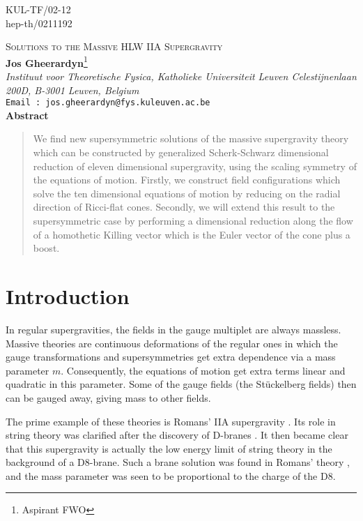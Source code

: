 \documentclass[a4paper,12pt]{article}
\begin{document}
\setcounter{page}{0}
\thispagestyle{empty}
\begin{flushright}
KUL-TF/02-12\\
hep-th/0211192\\[4cm]
\end{flushright}
\begin{center}
{\Large \textsc{Solutions to the Massive HLW IIA Supergravity}}\\[2cm]
{\bf Jos Gheerardyn}\footnote{Aspirant FWO}\\
\vspace{1cm}
\textit{Instituut voor Theoretische Fysica, Katholieke Universiteit Leuven \break
Celestijnenlaan 200D, B-3001 Leuven, Belgium}\\[.5cm]
\texttt{Email : jos.gheerardyn@fys.kuleuven.ac.be}\\[4cm]
{\bf Abstract}\\[.5cm]
\begin{quote}
{\small We find new supersymmetric solutions of the massive supergravity theory which can be constructed by generalized
Scherk-Schwarz dimensional reduction of eleven dimensional supergravity, using the scaling symmetry of the
equations of motion. Firstly, we construct field configurations which solve the ten dimensional equations of motion by reducing on the radial direction of Ricci-flat cones. Secondly, we will extend this result to the supersymmetric case by performing a dimensional reduction along the flow of a homothetic Killing vector which is the Euler vector of the cone plus a boost.}
\end{quote}
\end{center}
\newpage
\section{Introduction}
In regular supergravities, the fields in the gauge multiplet are always massless. Massive theories are continuous deformations of the regular ones in which the gauge transformations and supersymmetries get extra dependence via a mass parameter $m$. Consequently, the equations of motion get extra terms linear and quadratic in this parameter. Some of the gauge fields (the St\"uckelberg fields) then can be gauged away, giving mass to other fields.

The prime example of these theories is Romans' IIA supergravity \cite{Romans:1986tz}. Its role in string theory was clarified after the discovery of D-branes \cite{Polchinski:1995mt}. It then became clear that this supergravity is actually the low energy limit of string theory in the background of a D8-brane. Such a brane solution was found in Romans' theory \cite{Polchinski:1996df,Bergshoeff:1996ui}, and the mass parameter was seen to be proportional to the charge of the D8.
    
\end{document}
